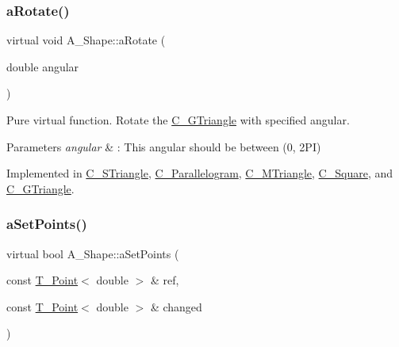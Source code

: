 \mbox{\label{classA__Shape_a25b4e0c34cdb46da5382fe9c7467efaf}} 
\subsubsection{\texorpdfstring{a\+Rotate()}{aRotate()}}
{\footnotesize\ttfamily virtual void A\+\_\+\+Shape\+::a\+Rotate (\begin{DoxyParamCaption}\item[{double}]{angular }\end{DoxyParamCaption})\hspace{0.3cm}{\ttfamily [pure virtual]}}



Pure virtual function. Rotate the \hyperlink{classC__GTriangle}{C\+\_\+\+G\+Triangle} with specified angular. 


\begin{DoxyParams}{Parameters}
{\em angular} & \+: This angular should be between (0, 2\+PI) \\
\hline
\end{DoxyParams}


Implemented in \hyperlink{classC__STriangle_a52612242aba17043862355c030637a18}{C\+\_\+\+S\+Triangle}, \hyperlink{classC__Parallelogram_a07b6dfae7100a409cdcf04d710ac9c3f}{C\+\_\+\+Parallelogram}, \hyperlink{classC__MTriangle_a33aa36879be70b0a11863801da56e92e}{C\+\_\+\+M\+Triangle}, \hyperlink{classC__Square_af74175a5e8d61216d68fde18ef9c9481}{C\+\_\+\+Square}, and \hyperlink{classC__GTriangle_a29c641aea4ef5fa4224b42dffc5fefa5}{C\+\_\+\+G\+Triangle}.

\mbox{\label{classA__Shape_a6996f454b337f8425ad13cba3f7a7c35}} 
\subsubsection{\texorpdfstring{a\+Set\+Points()}{aSetPoints()}}
{\footnotesize\ttfamily virtual bool A\+\_\+\+Shape\+::a\+Set\+Points (\begin{DoxyParamCaption}\item[{const \hyperlink{classT__Point}{T\+\_\+\+Point}$<$ double $>$ \&}]{ref,  }\item[{const \hyperlink{classT__Point}{T\+\_\+\+Point}$<$ double $>$ \&}]{changed }\end{DoxyParamCaption})\hspace{0.3cm}{\ttfamily [pure virtual]}}



